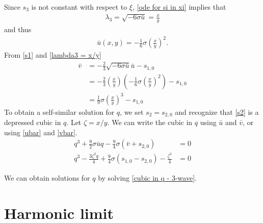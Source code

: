 \documentclass[12pt]{article}
\numberwithin{equation}{section}
\begin{document}
Since $s_3$ is not constant with respect to $\xi$, \eqref{ode for si in xi} implies that
\begin{align}
    \lambda_3 = \sqrt{-6\sigma\bar u} = \frac{x}{y} \label{lambda3 = x/y}
\end{align}
and thus 
\begin{align}
    \bar u(x,y) = -\frac{1}{6}\sigma\left(\frac{x}{y}\right)^2. \label{ubar}
\end{align}
From \eqref{s1} and \eqref{lambda3 = x/y}
\begin{align}
    \bar v &= -\frac{2}{3}\sqrt{-6\sigma \bar u}\bar u - s_{1,0} \nonumber\\
    &= -\frac{2}{3}\left(\frac{x}{y}\right)\left(-\frac{1}{6}\sigma\left(\frac{x}{y}\right)^2\right) - s_{1,0} \nonumber\\
    &= \frac{1}{9}\sigma\left(\frac{x}{y}\right)^3 - s_{1,0} \label{vbar}
\end{align}
To obtain a self-similar solution for $q$, we set $s_2 = s_{2,0}$ and recognize that \eqref{s2} is a depressed cubic in $q$. Let $\zeta = x/y$. We can write the cubic in $q$ using $\bar u$ and $\bar v$, or using \eqref{ubar} and \eqref{vbar}.
\begin{align}
    q^3 + \frac{9}{2}\sigma \bar u q - \frac{9}{4}\sigma (\bar v + s_{2,0}) &= 0  \nonumber\\
    q^3-\frac{3 \zeta ^2 q}{4}+\frac{9}{4} \sigma  \left(s_{1,0}-s_{2,0}\right)-\frac{\zeta ^3}{4} &= 0 \label{cubic in q - 3-wave}
\end{align}

We can obtain solutions for $q$ by solving \eqref{cubic in q - 3-wave}.



\section{Harmonic limit}
\end{document}
